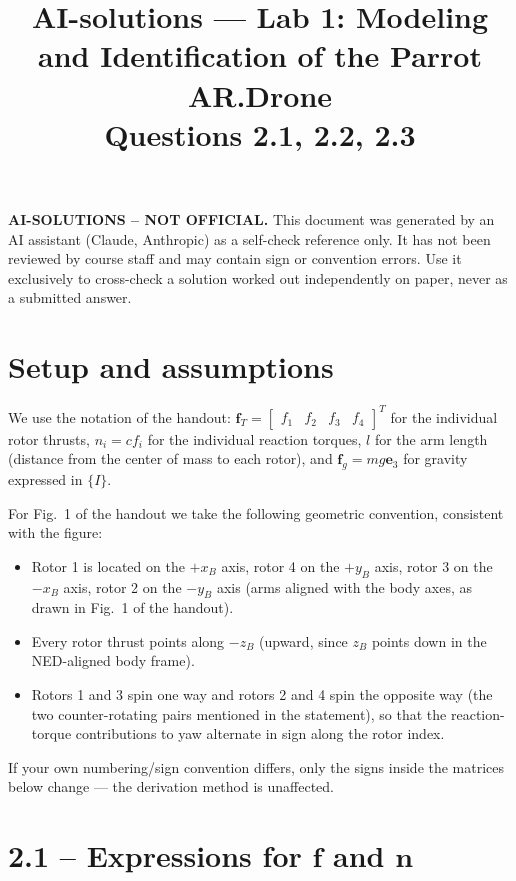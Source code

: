 \documentclass[11pt]{article}
\title{\Large AI-solutions --- Lab 1: Modeling and Identification of the Parrot AR.Drone \\[2pt]
\large Questions 2.1, 2.2, 2.3}
\author{}
\date{}
\newcommand{\vect}[1]{\mathbf{#1}}
\begin{document}
\maketitle

\begin{framed}
\textbf{\color{red} AI-SOLUTIONS -- NOT OFFICIAL.}
This document was generated by an AI assistant (Claude, Anthropic) as a self-check reference only.
It has not been reviewed by course staff and may contain sign or convention errors.
Use it exclusively to cross-check a solution worked out independently on paper, never as a submitted answer.
\end{framed}

\section*{Setup and assumptions}

We use the notation of the handout: $\vect{f}_T = \begin{bmatrix} f_1 & f_2 & f_3 & f_4 \end{bmatrix}^T$ for the individual rotor thrusts, $n_i = c f_i$ for the individual reaction torques, $l$ for the arm length (distance from the center of mass to each rotor), and $\vect{f}_g = mg\vect{e}_3$ for gravity expressed in $\{I\}$.

For Fig.~1 of the handout we take the following geometric convention, consistent with the figure:
\begin{itemize}
    \item Rotor 1 is located on the $+x_B$ axis, rotor 4 on the $+y_B$ axis, rotor 3 on the $-x_B$ axis, rotor 2 on the $-y_B$ axis (arms aligned with the body axes, as drawn in Fig.~1 of the handout).
    \item Every rotor thrust points along $-z_B$ (upward, since $z_B$ points down in the NED-aligned body frame).
    \item Rotors 1 and 3 spin one way and rotors 2 and 4 spin the opposite way (the two counter-rotating pairs mentioned in the statement), so that the reaction-torque contributions to yaw alternate in sign along the rotor index.
\end{itemize}
If your own numbering/sign convention differs, only the signs inside the matrices below change --- the derivation method is unaffected.

\section*{2.1 -- Expressions for $\vect{f}$ and $\vect{n}$}
\end{document}
